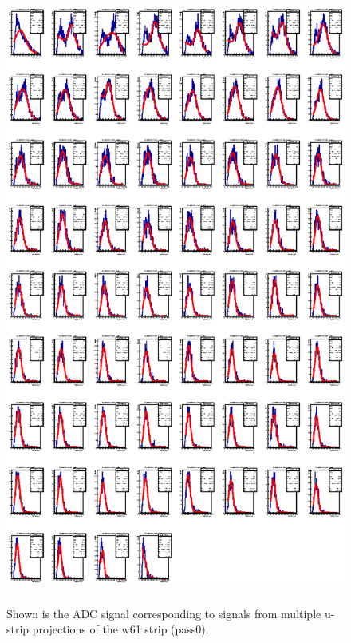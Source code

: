 \begin{figure}[h]
    \centering
    \includegraphics[width=\textwidth, height= 8in, keepaspectratio = true]{w61sigfitpass0}
    \caption{Shown is the ADC signal corresponding to signals from multiple u-strip projections of the w61 strip (pass0).}
    \label{fig:w61sigfitpass0}
\end{figure}

